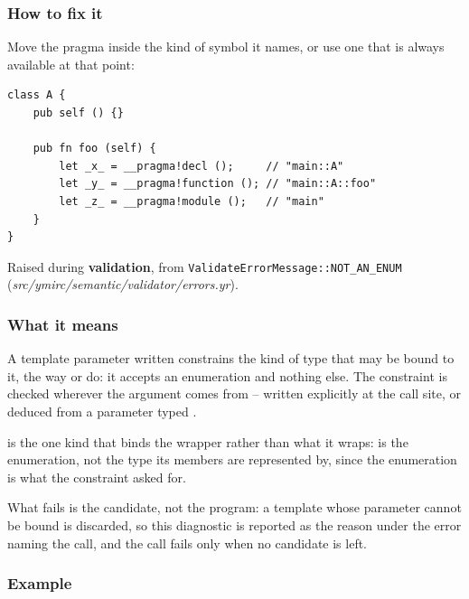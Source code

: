 \subsubsection*{How to fix it}

Move the pragma inside the kind of symbol it names, or use one that is always available at that point:

\begin{lstlisting}[style=coloredverbatim]
class A {
    pub self () {}

    pub fn foo (self) {
        let _x_ = __pragma!decl ();     // "main::A"
        let _y_ = __pragma!function (); // "main::A::foo"
        let _z_ = __pragma!module ();   // "main"
    }
}
\end{lstlisting}

\label{sec:codes:e4316}

Raised during \textbf{validation}, from \texttt{ValidateErrorMessage::\allowbreak{}NOT\_\allowbreak{}AN\_\allowbreak{}ENUM} (\textit{src/\allowbreak{}ymirc/\allowbreak{}semantic/\allowbreak{}validator/\allowbreak{}errors.yr}).

\subsubsection*{What it means}

A template parameter written  constrains the kind of type that may be bound to it, the way  or  do: it accepts an enumeration and nothing else. The constraint is checked wherever the argument comes from -- written explicitly at the call site, or deduced from a parameter typed .

 is the one kind that binds the wrapper rather than what it wraps:  is the enumeration, not the type its members are represented by, since the enumeration is what the constraint asked for.

What fails is the candidate, not the program: a template whose parameter cannot be bound is discarded, so this diagnostic is reported as the reason under the error naming the call, and the call fails only when no candidate is left.

\subsubsection*{Example}

